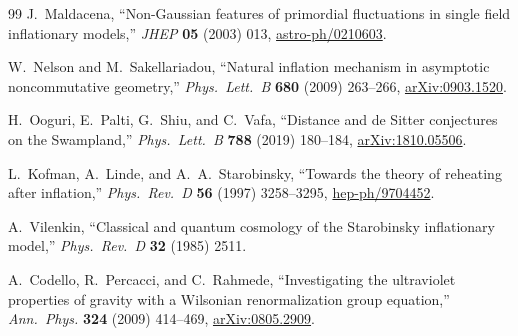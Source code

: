 \documentclass[11pt,a4paper]{article}
\theoremstyle{plain}
\theoremstyle{definition}
\begin{document}
\begin{thebibliography}{99}
J.~Maldacena,
``Non-Gaussian features of primordial fluctuations in single field
inflationary models,''
\emph{JHEP} \textbf{05} (2003) 013,
\href{https://arxiv.org/abs/astro-ph/0210603}{astro-ph/0210603}.

W.~Nelson and M.~Sakellariadou,
``Natural inflation mechanism in asymptotic noncommutative geometry,''
\emph{Phys.\ Lett.\ B} \textbf{680} (2009) 263--266,
\href{https://arxiv.org/abs/0903.1520}{arXiv:0903.1520}.

H.~Ooguri, E.~Palti, G.~Shiu, and C.~Vafa,
``Distance and de Sitter conjectures on the Swampland,''
\emph{Phys.\ Lett.\ B} \textbf{788} (2019) 180--184,
\href{https://arxiv.org/abs/1810.05506}{arXiv:1810.05506}.

L.~Kofman, A.~Linde, and A.~A.~Starobinsky,
``Towards the theory of reheating after inflation,''
\emph{Phys.\ Rev.\ D} \textbf{56} (1997) 3258--3295,
\href{https://arxiv.org/abs/hep-ph/9704452}{hep-ph/9704452}.

A.~Vilenkin,
``Classical and quantum cosmology of the Starobinsky inflationary model,''
\emph{Phys.\ Rev.\ D} \textbf{32} (1985) 2511.

A.~Codello, R.~Percacci, and C.~Rahmede,
``Investigating the ultraviolet properties of gravity with a
Wilsonian renormalization group equation,''
\emph{Ann.\ Phys.} \textbf{324} (2009) 414--469,
\href{https://arxiv.org/abs/0805.2909}{arXiv:0805.2909}.

\end{thebibliography}
\end{document}
